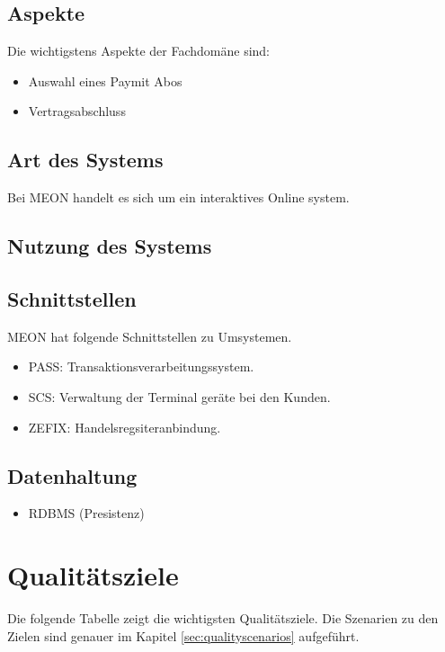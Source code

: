\subsection{Aspekte}

Die wichtigstens Aspekte der Fachdomäne sind: 
\begin{itemize}
	\item Auswahl eines Paymit Abos
	\item Vertragsabschluss
\end{itemize}

\subsection{Art des Systems}

Bei MEON handelt es sich um ein interaktives Online system.

\subsection{Nutzung des Systems}

\subsection{Schnittstellen}

MEON hat folgende Schnittstellen zu Umsystemen.
\begin{itemize}
	\item PASS: Transaktionsverarbeitungssystem.
	\item SCS:  Verwaltung der Terminal geräte bei den Kunden.
	\item ZEFIX: Handelsregsiteranbindung.
\end{itemize}

\subsection{Datenhaltung}

\begin{itemize}
	\item RDBMS (Presistenz)
\end{itemize}

\section{Qualitätsziele}

Die folgende Tabelle zeigt die wichtigsten Qualitätsziele. Die Szenarien zu den Zielen sind genauer im Kapitel \ref{sec:qualityscenarios} aufgeführt.

